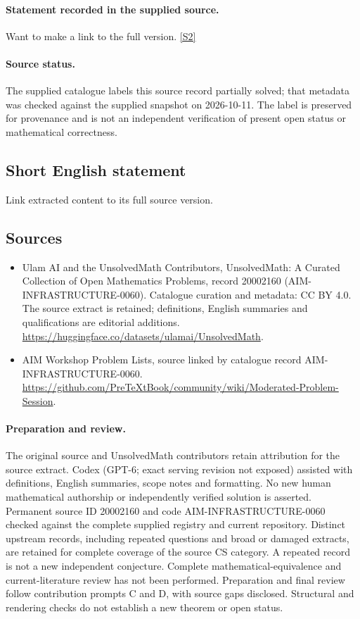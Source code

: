 \documentclass[11pt]{article}
\begin{document}
\paragraph{Statement recorded in the supplied source.}
Want to make a link to the full version. \href{https://github.com/PreTeXtBook/community/wiki/Moderated-Problem-Session}{[S2]}
\paragraph{Source status.}
The supplied catalogue labels this source record partially solved; that metadata was checked against the supplied snapshot on 2026-10-11. The label is preserved for provenance and is not an independent verification of present open status or mathematical correctness.
\subsection{Short English statement}
Link extracted content to its full source version.
\subsection{Sources}
\begin{itemize}
\item[S1] Ulam AI and the UnsolvedMath Contributors, UnsolvedMath: A Curated Collection of Open Mathematics Problems, record 20002160 (AIM-INFRASTRUCTURE-0060). Catalogue curation and metadata: CC BY 4.0. The source extract is retained; definitions, English summaries and qualifications are editorial additions.
\url{https://huggingface.co/datasets/ulamai/UnsolvedMath}.
\item[S2] AIM Workshop Problem Lists, source linked by catalogue record AIM-INFRASTRUCTURE-0060.
\url{https://github.com/PreTeXtBook/community/wiki/Moderated-Problem-Session}.
\end{itemize}
\paragraph{Preparation and review.}
The original source and UnsolvedMath contributors retain attribution for the source extract. Codex (GPT-6; exact serving revision not exposed) assisted with definitions, English summaries, scope notes and formatting. No new human mathematical authorship or independently verified solution is asserted. Permanent source ID 20002160 and code AIM-INFRASTRUCTURE-0060 checked against the complete supplied registry and current repository. Distinct upstream records, including repeated questions and broad or damaged extracts, are retained for complete coverage of the source CS category. A repeated record is not a new independent conjecture. Complete mathematical-equivalence and current-literature review has not been performed. Preparation and final review follow contribution prompts C and D, with source gaps disclosed. Structural and rendering checks do not establish a new theorem or open status.
\label{end:20002160}
\end{document}
